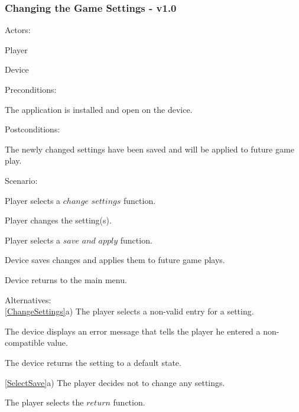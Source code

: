 \documentclass[12pt]{article}
\newenvironment{itemize*}%
  {\begin{itemize}%
  	\setlength{\parsep}{0pt}
    \setlength{\itemsep}{0pt}%
    \setlength{\parskip}{0pt}}%
  {\end{itemize}}
\newenvironment{enumerate*}%
  {\begin{enumerate}%
  	\setlength{\parsep}{0pt}
    \setlength{\itemsep}{0pt}%
    \setlength{\parskip}{0pt}}%
  {\end{enumerate}}
\begin{document}
\subsubsection*{Changing the Game Settings - v1.0}
Actors:
\begin{itemize*}
\item Player
\item Device
\end{itemize*}
Preconditions:
\begin{itemize*}
\item The application is installed and open on the device.
\end{itemize*}
Postconditions:
\begin{itemize*}
\item The newly changed settings have been saved and will be applied to future game play.
\end{itemize*}
Scenario:
\begin{enumerate*}
\item \label{SelectChangeSettings}Player selects a $change$ $settings$ function.
\item \label{ChangeSettings}Player changes the setting(s).
\item \label{SelectSave}Player selects a $save$ $and$ $apply$ function.
\item \label{SystemSaves}Device saves changes and applies them to future game plays.
\item \label{ReturnToMainMenu}Device returns to the main menu.
\end{enumerate*}
Alternatives:\\
\ref{ChangeSettings}a) The player selects a non-valid entry for a setting.
\begin{enumerate*}
\item The device displays an error message that tells the player he entered a non-compatible value.
\item The device returns the setting to a default state.
\end{enumerate*}
\ref{SelectSave}a) The player decides not to change any settings.
\begin{enumerate*}
\item The player selects the $return$ function.
\end{enumerate*}
\onehalfspacing

\singlespacing
\end{document}
